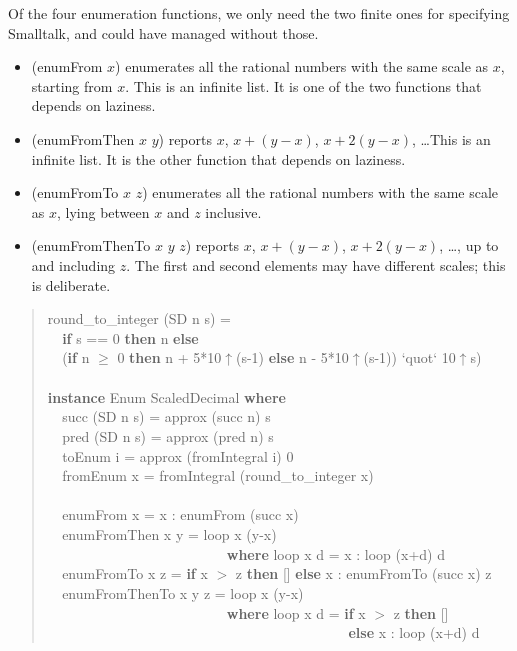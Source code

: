 \documentclass[prodmode,acmtoplas]{acmsmall}
\begin{document}
Of the four enumeration functions, we only need the two finite
ones for specifying Smalltalk, and could have managed without
those.
\begin{itemize}
\item (enumFrom $x$) enumerates all the rational numbers with
the same scale as $x$, starting from $x$.  This is an infinite
list.  It is one of the two functions that depends on laziness.
\item (enumFromThen $x$ $y$) reports $x$, $x+(y-x)$, $x+2(y-x)$,
\dots   This is an infinite list.  It is the other function that
depends on laziness.
\item (enumFromTo $x$ $z$) enumerates all the rational numbers
with the same scale as $x$, lying between $x$ and $z$ inclusive.
\item (enumFromThenTo $x$ $y$ $z$) reports $x$, $x+(y-x)$,
$x+2(y-x)$, \dots, up to and including $z$.  The first
and second elements may have different scales; this is deliberate.
\end{itemize}

\begin{quote}
\begin{tabbing}
\sffamily round\_to\_integer (SD n s) =\\
\verb|  |\sffamily  \textbf{if} s == 0 \textbf{then} n \textbf{else}\\
\verb|  |\sffamily  (\textbf{if} n $\ge$ 0 \textbf{then} n + 5*10$\uparrow$(s-1) \textbf{else} n - 5*10$\uparrow$(s-1)) `quot` 10$\uparrow$s)\\
\\
\sffamily \textbf{instance} Enum ScaledDecimal \textbf{where}\\
\verb|  |\sffamily  succ (SD n s) = approx (succ n) s\\
\verb|  |\sffamily  pred (SD n s) = approx (pred n) s\\
\verb|  |\sffamily  toEnum i      = approx (fromIntegral i) 0\\
\verb|  |\sffamily  fromEnum x    = fromIntegral (round\_to\_integer x) \\
\\
\verb|  |\sffamily  enumFrom       x     = x : enumFrom (succ x)\\
\verb|  |\sffamily  enumFromThen   x y   = loop x (y-x)\\
\verb|                         |\sffamily                         \textbf{where} loop x d = x : loop (x+d) d\\
\verb|  |\sffamily  enumFromTo     x   z = \textbf{if} x $>$ z \textbf{then} [] \textbf{else} x : enumFromTo (succ x) z\\
\verb|  |\sffamily  enumFromThenTo x y z = loop x (y-x)\\
\verb|                         |\sffamily                         \textbf{where} loop x d = \textbf{if} x $>$ z \textbf{then} []\\
\verb|                                          |\sffamily                                          \textbf{else} x : loop (x+d) d
\end{tabbing}
\end{quote}
\end{document}
